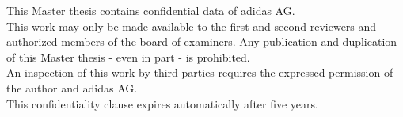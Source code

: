 
\vspace{2cm}



This Master thesis contains confidential data of adidas AG. 
\\
This work may only be made available to the first and second reviewers and authorized members of the board of examiners. Any publication and duplication of this Master thesis - even in part - is prohibited.
\\
An inspection of this work by third parties requires the expressed permission of the author and adidas AG.
\\
This confidentiality clause expires automatically after five years.


